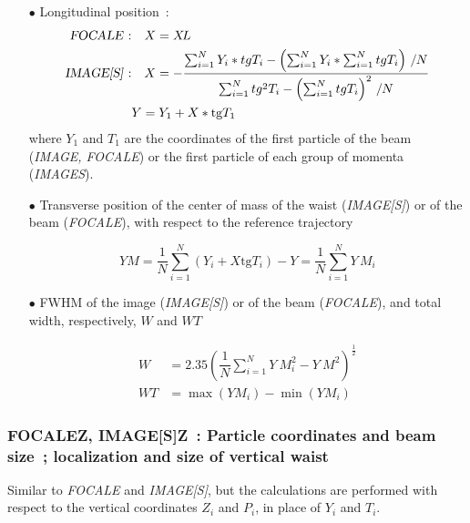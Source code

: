 \begin{itemize}
\item[$\bullet$]Longitudinal position~: 
       \begin{align*}
       \text{\textsl{FOCALE}~:} & \quad  X=\XL  \\
       \text{\textsl{IMAGE[S]}~:} & \quad   X    = - 
    \dfrac{ \sum^ N_{i=1}Y_i\ast tgT_i- 
         \left( \sum^ N_{i=1}Y_i\ast \sum^N_{i=1}tgT_i \right)\, /N }{%
        \sum^ N_{i=1}tg^2T_i- \left( \sum^ N_{i=1}tgT_i\right)^2\, /N} \\ 
            & Y   =   Y_1+X  \ast   \text{tg} T_1  
        \end{align*}    
where $ Y_1 $ and $ T_1 $ are the coordinates of the first particle
of the beam (\textsl{IMAGE, FOCALE}) or the first particle of each group of momenta 
(\textsl{IMAGES}). 

\item[$\bullet$]Transverse position of the center of mass of the waist 
(\textsl{IMAGE[S]}) or of the beam (\textsl{FOCALE}), with respect to the reference trajectory 

$$ YM = \frac{1 }{ N} \sum^ N_{i=1}(Y_i+X  \text{tg} T_i)-Y=
      \frac{1 }{ N} \sum^ N_{i=1}Y\, M_i $$

\item[$\bullet$]FWHM of the image (\textsl{IMAGE[S]}) or of the beam 
(\textsl{FOCALE}), and  total width, respectively, $ W $ and $ WT $

\begin{align*}
	W &   =     2.35 \left( \dfrac{1 }{ N} \sum^ N_{i=1}Y\ M^2_i - Y\ M^2 \right)^{\frac{1}{2}} \\ 
	WT &   =    \max (YM_i)- \min  (YM_i)  
\end{align*}
\end{itemize}

\vfill

\subsubsection*{FOCALEZ, IMAGE[S]Z~: Particle coordinates and beam size~;  localization and 
size  of  vertical waist}\label{FOCALEZ}\label{IMAGEZ}\label{IMAGESZ}
          
Similar to \textsl{FOCALE} and \textsl{IMAGE[S]}, but the calculations are performed 
with respect to the vertical coordinates $ Z_i $ and $ P_i $, in place of $Y_i $ 
and $ T_i$. 
\vfill

